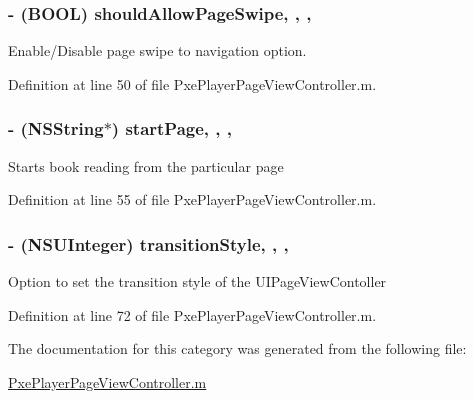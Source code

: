 \hypertarget{category_pxe_player_page_view_controller_07_08_aee05105a7a1e6407c1e86b6ed04ae2a9}{
\subsubsection[{should\-Allow\-Page\-Swipe}]{\setlength{\rightskip}{0pt plus 5cm}-\/ (B\-O\-O\-L) should\-Allow\-Page\-Swipe\hspace{0.3cm}{\ttfamily [read]}, {\ttfamily [write]}, {\ttfamily [nonatomic]}, {\ttfamily [assign]}}}\label{category_pxe_player_page_view_controller_07_08_aee05105a7a1e6407c1e86b6ed04ae2a9}
Enable/\-Disable page swipe to navigation option. 

Definition at line 50 of file Pxe\-Player\-Page\-View\-Controller.\-m.

\hypertarget{category_pxe_player_page_view_controller_07_08_ae3b736e136429f4b8cc93b93fa680703}{
\subsubsection[{start\-Page}]{\setlength{\rightskip}{0pt plus 5cm}-\/ (N\-S\-String$\ast$) start\-Page\hspace{0.3cm}{\ttfamily [read]}, {\ttfamily [write]}, {\ttfamily [nonatomic]}, {\ttfamily [strong]}}}\label{category_pxe_player_page_view_controller_07_08_ae3b736e136429f4b8cc93b93fa680703}
Starts book reading from the particular page 

Definition at line 55 of file Pxe\-Player\-Page\-View\-Controller.\-m.

\hypertarget{category_pxe_player_page_view_controller_07_08_a5d1f551e72ef07acb9057d1c68d4e4a3}{
\subsubsection[{transition\-Style}]{\setlength{\rightskip}{0pt plus 5cm}-\/ (N\-S\-U\-Integer) transition\-Style\hspace{0.3cm}{\ttfamily [read]}, {\ttfamily [write]}, {\ttfamily [nonatomic]}, {\ttfamily [assign]}}}\label{category_pxe_player_page_view_controller_07_08_a5d1f551e72ef07acb9057d1c68d4e4a3}
Option to set the transition style of the U\-I\-Page\-View\-Contoller 

Definition at line 72 of file Pxe\-Player\-Page\-View\-Controller.\-m.



The documentation for this category was generated from the following file\-:\begin{DoxyCompactItemize}
\item 
\hyperlink{_pxe_player_page_view_controller_8m}{Pxe\-Player\-Page\-View\-Controller.\-m}\end{DoxyCompactItemize}
